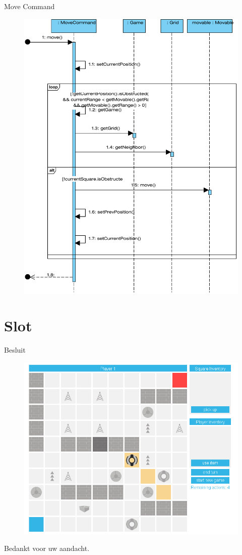 \documentclass[t]{beamer}
\begin{document}
\begin{frame}{Move Command}
\begin{figure}
	\center
	\includegraphics[scale=0.22]{img/movecommand}
\end{figure}
\end{frame}


\section{Slot}
\begin{frame}{Besluit}

\begin{center}
\begin{figure}
\includegraphics[scale=0.2]{img/game}
\end{figure}
\vspace{0.1in}
Bedankt voor uw aandacht.
\end{center}
\end{frame}
\end{document}
